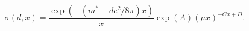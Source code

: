 \begin{equation}
\sigma(d,x)=\frac{\exp(-(m^{\ast}+de^{2}/8\pi)x)}{x}\exp(A)(\mu x)^{-Cx+D}.
\end{equation}

